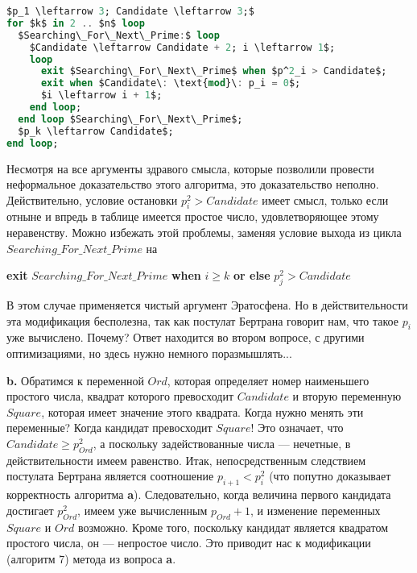 \begin{lstlisting}[mathescape=true, language=Ada, caption=Генерация простых чисел]
$p_1 \leftarrow 3; Candidate \leftarrow 3;$
for $k$ in 2 .. $n$ loop
  $Searching\_For\_Next\_Prime:$ loop
    $Candidate \leftarrow Candidate + 2; i \leftarrow 1$;
    loop
      exit $Searching\_For\_Next\_Prime$ when $p^2_i > Candidate$;
      exit when $Candidate\: \text{mod}\: p_i = 0$;
      $i \leftarrow i + 1$;
    end loop;
  end loop $Searching\_For\_Next\_Prime$;
  $p_k \leftarrow Candidate$;
end loop;
\end{lstlisting}

Несмотря на все аргументы здравого смысла, которые позволили
провести неформальное доказательство этого алгоритма, это доказательство
неполно. Действительно, условие остановки $p^2_i > Candidate$ имеет смысл, только если отныне и впредь в таблице имеется простое число, удовлетворяющее этому неравенству. Можно избежать этой проблемы, заменяя условие выхода из цикла $Searching\_For\_Next\_Prime$ на\newline

\textbf{exit} $Searching\_For\_Next\_Prime$ \textbf{when} $i \geqslant k$ \textbf{or else} $p^2_j > Candidate$\newline

В этом случае применяется чистый аргумент Эратосфена. Но в действительности
эта модификация бесполезна, так как постулат Бертрана говорит нам,
что такое $p_i$ уже вычислено. Почему? Ответ находится во втором вопросе,
с другими оптимизациями, но здесь нужно немного поразмышлять...
\newpage

\textbf{b.} Обратимся к переменной $Ord$, которая определяет номер наименьшего простого числа,
квадрат которого превосходит $Candidate$ и вторую переменную $Square$, которая имеет
значение этого квадрата. Когда нужно менять эти переменные? Когда кандидат
превосходит $Square$! Это означает, что $Candidate \geqslant p^2_{Ord}$, а поскольку задействованные
числа — нечетные, в действительности имеем равенство. Итак, непосредственным следствием
постулата Бертрана является соотношение $p_{i+1} < p^2_i$ (что попутно доказывает корректность алгоритма \textbf{a}).
Следовательно, когда величина первого кандидата достигает $p^2_{Ord}$, имеем уже вычисленным $p_{Ord} + 1$,
и изменение переменных $Square$ и $Ord$ возможно. Кроме того, поскольку кандидат является
квадратом простого числа, он — непростое число. Это приводит нас к модификации (алгоритм 7) метода из вопроса \textbf{a}.

